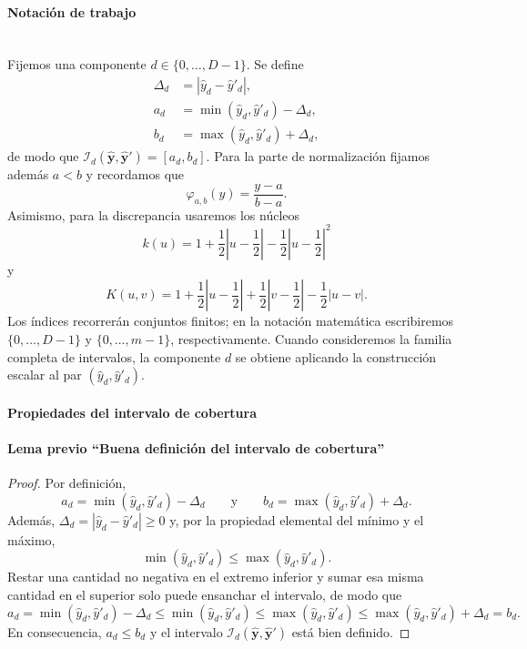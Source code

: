 \documentclass[12pt]{report} %
\begin{document}
\paragraph*{Notación de trabajo}\mbox{}\\
Fijemos una componente $d \in \{0, \ldots, D-1\}$. Se define
\begin{align*}
    \Delta_d & = |\hat{y}_d - \hat{y}'_d|,               \\
    a_d      & = \min(\hat{y}_d, \hat{y}'_d) - \Delta_d, \\
    b_d      & = \max(\hat{y}_d, \hat{y}'_d) + \Delta_d,
\end{align*}
de modo que $\mathcal{I}_d(\hat{\mathbf{y}}, \hat{\mathbf{y}}') = [a_d, b_d]$. Para la parte de normalización fijamos además $a < b$ y recordamos que
$$\varphi_{a,b}(y) = \frac{y-a}{b-a}.$$
Asimismo, para la discrepancia usaremos los núcleos
$$k(u) = 1 + \frac{1}{2}\left|u - \frac{1}{2}\right| - \frac{1}{2}\left|u - \frac{1}{2}\right|^2$$
y
$$K(u, v) = 1 + \frac{1}{2}\left|u - \frac{1}{2}\right| + \frac{1}{2}\left|v - \frac{1}{2}\right| - \frac{1}{2}|u-v|.$$
Los índices recorrerán conjuntos finitos; en la notación matemática escribiremos $\{0, \ldots, D-1\}$ y $\{0, \ldots, m-1\}$, respectivamente. Cuando consideremos la familia completa de intervalos, la componente $d$ se obtiene aplicando la construcción escalar al par $(\hat{y}_d, \hat{y}'_d)$.

\paragraph*{Propiedades del intervalo de cobertura}

\paragraph*{Lema previo ``Buena definición del intervalo de cobertura''}
\begin{proof}
    Por definición,
    $$a_d = \min(\hat{y}_d, \hat{y}'_d) - \Delta_d
        \qquad \text{y} \qquad
        b_d = \max(\hat{y}_d, \hat{y}'_d) + \Delta_d.$$
    Además, $\Delta_d = |\hat{y}_d - \hat{y}'_d| \ge 0$ y, por la propiedad elemental del mínimo y el máximo,
    $$\min(\hat{y}_d, \hat{y}'_d) \le \max(\hat{y}_d, \hat{y}'_d).$$
    Restar una cantidad no negativa en el extremo inferior y sumar esa misma cantidad en el superior solo puede ensanchar el intervalo, de modo que
    $$a_d = \min(\hat{y}_d, \hat{y}'_d) - \Delta_d
        \le \min(\hat{y}_d, \hat{y}'_d)
        \le \max(\hat{y}_d, \hat{y}'_d)
        \le \max(\hat{y}_d, \hat{y}'_d) + \Delta_d = b_d.$$
    En consecuencia, $a_d \le b_d$ y el intervalo $\mathcal{I}_d(\hat{\mathbf{y}}, \hat{\mathbf{y}}')$ está bien definido.
\end{proof}
\end{document}
